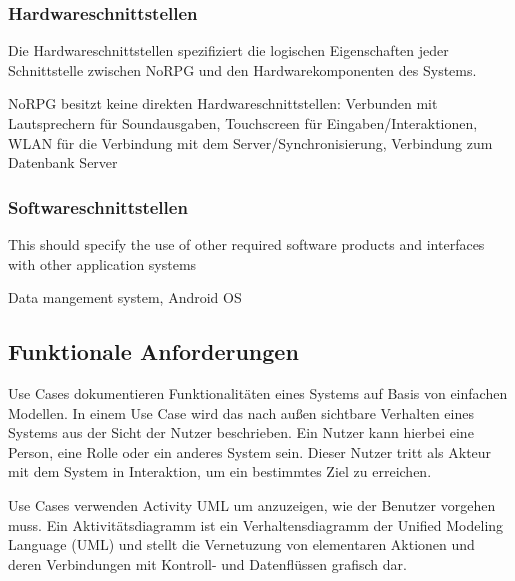 			
		
		\subsubsection{Hardwareschnittstellen}
			Die Hardwareschnittstellen spezifiziert die logischen Eigenschaften jeder Schnittstelle zwischen NoRPG und den Hardwarekomponenten des Systems.
			
			NoRPG besitzt keine direkten Hardwareschnittstellen: Verbunden mit Lautsprechern für Soundausgaben, Touchscreen für Eingaben/Interaktionen, WLAN für die Verbindung mit dem Server/Synchronisierung, Verbindung zum Datenbank Server
			
		\subsubsection{Softwareschnittstellen}
			This should specify the use of other required software products and interfaces with other application systems 
			
			Data mangement system, Android OS

	\subsection{Funktionale Anforderungen}
		Use Cases dokumentieren Funktionalitäten eines Systems auf Basis von einfachen Modellen. In einem Use Case wird das nach außen sichtbare Verhalten eines Systems aus der Sicht der Nutzer beschrieben. Ein Nutzer kann hierbei eine Person, eine Rolle oder ein anderes System sein. Dieser Nutzer tritt als Akteur mit dem System in Interaktion, um ein bestimmtes Ziel zu erreichen. %
		
		Use Cases verwenden Activity UML um anzuzeigen, wie der Benutzer vorgehen muss. Ein Aktivitätsdiagramm ist ein Verhaltensdiagramm der Unified Modeling Language (UML) und stellt die Vernetuzung von elementaren Aktionen und deren Verbindungen mit Kontroll- und Datenflüssen grafisch dar.
	
